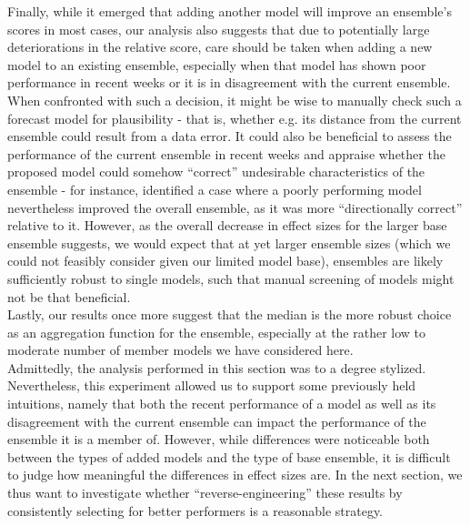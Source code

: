 Finally, while it emerged that adding another model will improve an ensemble's scores in most cases, our analysis also suggests that due to potentially large deteriorations in the relative score, care should be taken when adding a new model to an existing ensemble, especially when that model has shown poor performance in recent weeks or it is in disagreement with the current ensemble. When confronted with such a decision, it might be wise to manually check such a forecast model for plausibility - that is, whether e.g. its distance from the current ensemble could result from a data error. It could also be beneficial to assess the performance of the current ensemble in recent weeks and appraise whether the proposed model could somehow ``correct'' undesirable characteristics of the ensemble - for instance, \cite{bosse_comparing_2021} identified a case where a poorly performing model nevertheless improved the overall ensemble, as it was more ``directionally correct'' relative to it. However, as the overall decrease in effect sizes for the larger base ensemble suggests, we would expect that at yet larger ensemble sizes (which we could not feasibly consider given our limited model base), ensembles are likely sufficiently robust to single models, such that manual screening of models might not be that beneficial.\\
Lastly, our results once more suggest that the median is the more robust choice as an aggregation function for the ensemble, especially at the rather low to moderate number of member models we have considered here.\\
Admittedly, the analysis performed in this section was to a degree stylized. Nevertheless, this experiment allowed us to support some previously held intuitions, namely that both the recent performance of a model as well as its disagreement with the current ensemble can impact the performance of the ensemble it is a member of. However, while differences were noticeable both between the types of added models and the type of base ensemble, it is difficult to judge how meaningful the differences in effect sizes are. In the next section, we thus want to investigate whether ``reverse-engineering'' these results by consistently selecting for better performers is a reasonable strategy.\\
